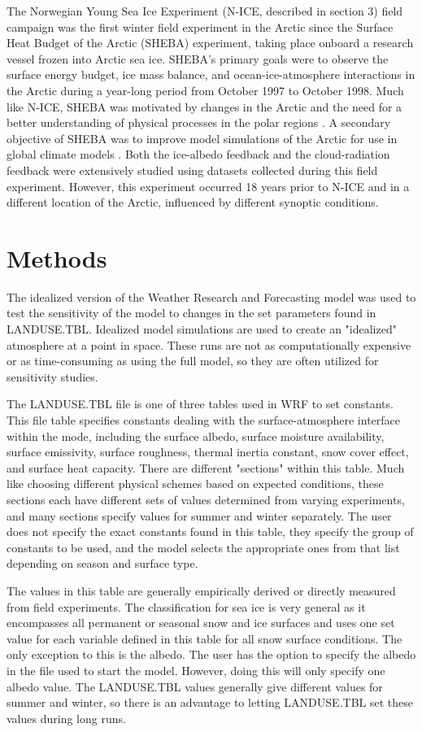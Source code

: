 The Norwegian Young Sea Ice Experiment (N-ICE, described in section 3) field campaign was the first winter field experiment in the Arctic since the Surface Heat Budget of the Arctic (SHEBA) experiment, taking place onboard a research vessel frozen into Arctic sea ice. SHEBA’s primary goals were to observe the surface energy budget, ice mass balance, and ocean-ice-atmosphere interactions in the Arctic during a year-long period from October 1997 to October 1998. Much like N-ICE, SHEBA was motivated by changes in the Arctic and the need for a better understanding of physical processes in the polar regions \citep{randall:1998}. A secondary objective of SHEBA was to improve model simulations of the Arctic for use in global climate models \citep{uttal:2002}. Both the ice-albedo feedback and the cloud-radiation feedback were extensively studied using datasets collected during this field experiment. However, this experiment occurred 18 years prior to N-ICE and in a different location of the Arctic, influenced by different synoptic conditions. 

\section{Methods}
The idealized version of the Weather Research and Forecasting model was used to test the sensitivity of the model to changes in the set parameters found in LANDUSE.TBL. Idealized model simulations are used to create an "idealized" atmosphere at a point in space. These runs are not as computationally expensive or as time-consuming as using the full model, so they are often utilized for sensitivity studies.

The LANDUSE.TBL file is one of three tables used in WRF to set constants. This file table specifies constants dealing with the surface-atmosphere interface within the mode, including the surface albedo, surface moisture availability, surface emissivity, surface roughness, thermal inertia constant, snow cover effect, and surface heat capacity. There are different "sections" within this table. Much like choosing different physical schemes based on expected conditions, these sections each have different sets of values determined from varying experiments, and many sections specify values for summer and winter separately. The user does not specify the exact constants found in this table, they specify the group of constants to be used, and the model selects the appropriate ones from that list depending on season and surface type.

The values in this table are generally empirically derived or directly measured from field experiments. The classification for sea ice is very general as it encompasses all permanent or seasonal snow and ice surfaces and uses one set value for each variable defined in this table for all snow surface conditions. The only exception to this is the albedo. The user has the option to specify the albedo in the file used to start the model. However, doing this will only specify one albedo value. The LANDUSE.TBL values generally give different values for summer and winter, so there is an advantage to letting LANDUSE.TBL set these values during long runs. 

